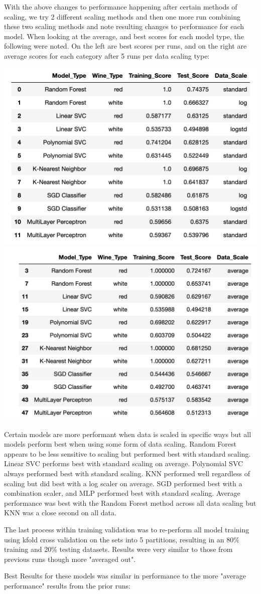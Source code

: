 \documentclass[titlepage]{article}
\begin{document}
With the above changes to performance happening after certain methods of scaling, we try 2 different scaling methods and then one more run combining these two scaling methods and note resulting changes to performance for each model.   When looking at the average, and best scores for each model type, the following were noted.  On the left are best scores per runs, and on the right are average scores for each category after 5 runs per data scaling type:  

\begin{center}
	\includegraphics[width=.4\textwidth]{img/bestscores.png}	\includegraphics[width=.4\textwidth]{img/avescores.png}
\end{center}

Certain models are more performant when data is scaled in specific ways but all models perform best when using some form of data scaling.  Random Forest appears to be less sensitive to scaling but performed best with standard scaling.  Linear SVC performs best with standard scaling on average.  Polynomial SVC always performed best with standard scaling.  KNN performed well regardless of scaling but did best with a log scaler on average.  SGD performed best with a combination scaler, and MLP performed best with standard scaling.  Average performance was best with the Random Forest method across all data scaling but KNN was a close second on all data. 

The last process within training validation was to re-perform all model training using kfold cross validation on the sets into 5 partitions, resulting in an 80\% training and 20\% testing datasets.  Results were very similar to those from previous runs though more "averaged out".  

Best Results for these models was similar in performance to the more "average performance" results from the prior runs: 
\end{document}

